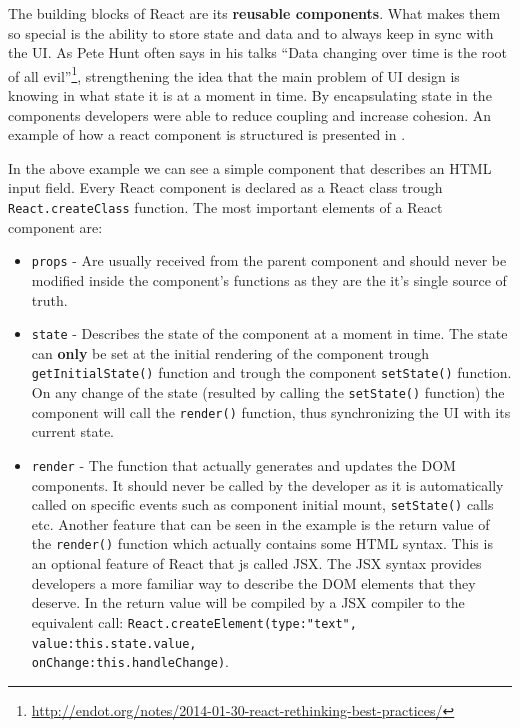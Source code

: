 The building blocks of React are its \textbf{reusable components}. What makes them so special is the ability to store state and data and to always keep in sync with the UI. As Pete Hunt often says in his talks ``Data changing over time is the root of all evil''\footnote{\url{http://endot.org/notes/2014-01-30-react-rethinking-best-practices/}}, strengthening the idea that the main problem of UI design is knowing in what state it is at a moment in time. By encapsulating state in the components developers were able to reduce coupling and increase cohesion. An example of how a react component is structured is presented in .



In the above example we can see a simple component that describes an HTML input field. Every React component is declared as a React class trough \texttt{React.createClass} function. The most important elements of a React component are:
\begin{itemize}
	\item \texttt{props} - Are usually received from the parent component and should never be modified inside the component's functions as they are the it's single source of truth.
	\item \texttt{state} - Describes the state of the component at a moment in time. The state can \textbf{only} be set at the initial rendering of the component trough \texttt{getInitialState()} function and trough the component \texttt{setState()} function. On any change of the state (resulted by calling the \texttt{setState()} function) the component will call the \texttt{render()} function, thus synchronizing the UI with its current state.
	\item \texttt{render} - The function that actually generates and updates the DOM components. It should never be called by the developer as it is automatically called on specific events such as component initial mount, \texttt{setState()} calls etc. Another feature that can be seen in the example is the return value of the \texttt{render()} function which actually contains some HTML syntax. This is an optional feature of React that js called JSX. The JSX syntax provides developers a more familiar way to describe the DOM elements that they deserve. In  the return value will be compiled by a JSX compiler to the equivalent call:
	\texttt{React.createElement(type:"text", value:this.state.value,\\ onChange:this.handleChange)}.
\end{itemize}

